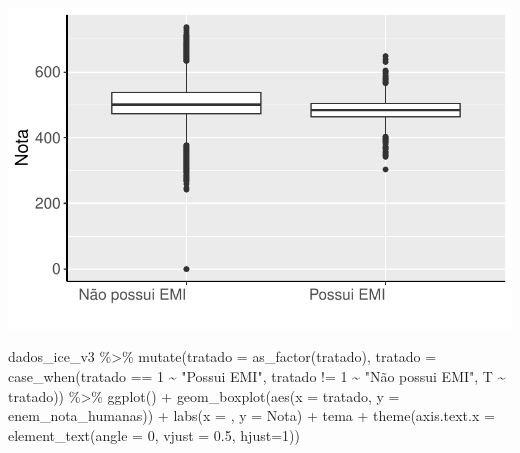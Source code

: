 \documentclass[
  letterpaper,
  DIV=11,
  numbers=noendperiod]{scrartcl}
\newenvironment{Shaded}{\begin{snugshade}}{\end{snugshade}}
\newcommand{\AttributeTok}[1]{\textcolor[rgb]{0.40,0.45,0.13}{#1}}
\newcommand{\DecValTok}[1]{\textcolor[rgb]{0.68,0.00,0.00}{#1}}
\newcommand{\FloatTok}[1]{\textcolor[rgb]{0.68,0.00,0.00}{#1}}
\newcommand{\FunctionTok}[1]{\textcolor[rgb]{0.28,0.35,0.67}{#1}}
\newcommand{\NormalTok}[1]{\textcolor[rgb]{0.00,0.23,0.31}{#1}}
\newcommand{\SpecialCharTok}[1]{\textcolor[rgb]{0.37,0.37,0.37}{#1}}
\newcommand{\StringTok}[1]{\textcolor[rgb]{0.13,0.47,0.30}{#1}}
\begin{document}
\includegraphics[width=1\textwidth,height=1\textheight]{script_files/figure-latex/unnamed-chunk-9-3.pdf}

\begin{Shaded}
\begin{Highlighting}[]
\NormalTok{dados\_ice\_v3 }\SpecialCharTok{\%\textgreater{}\%} 
  \FunctionTok{mutate}\NormalTok{(}\AttributeTok{tratado =} \FunctionTok{as\_factor}\NormalTok{(tratado),}
    \AttributeTok{tratado =} \FunctionTok{case\_when}\NormalTok{(tratado }\SpecialCharTok{==} \DecValTok{1} \SpecialCharTok{\textasciitilde{}} \StringTok{"Possui EMI"}\NormalTok{,}
\NormalTok{                        tratado }\SpecialCharTok{!=} \DecValTok{1} \SpecialCharTok{\textasciitilde{}} \StringTok{"Não possui EMI"}\NormalTok{,}
\NormalTok{                        T }\SpecialCharTok{\textasciitilde{}}\NormalTok{ tratado)) }\SpecialCharTok{\%\textgreater{}\%} 
  \FunctionTok{ggplot}\NormalTok{() }\SpecialCharTok{+}
  \FunctionTok{geom\_boxplot}\NormalTok{(}\FunctionTok{aes}\NormalTok{(}\AttributeTok{x =}\NormalTok{ tratado, }\AttributeTok{y =}\NormalTok{ enem\_nota\_humanas)) }\SpecialCharTok{+}
  \FunctionTok{labs}\NormalTok{(}\AttributeTok{x =}  \StringTok{\textquotesingle{}\textquotesingle{}}\NormalTok{, }\AttributeTok{y =} \StringTok{\textquotesingle{}Nota\textquotesingle{}}\NormalTok{) }\SpecialCharTok{+}
\NormalTok{  tema }\SpecialCharTok{+}
  \FunctionTok{theme}\NormalTok{(}\AttributeTok{axis.text.x =} \FunctionTok{element\_text}\NormalTok{(}\AttributeTok{angle =} \DecValTok{0}\NormalTok{, }\AttributeTok{vjust =} \FloatTok{0.5}\NormalTok{, }\AttributeTok{hjust=}\DecValTok{1}\NormalTok{))}
\end{Highlighting}
\end{Shaded}
\end{document}
